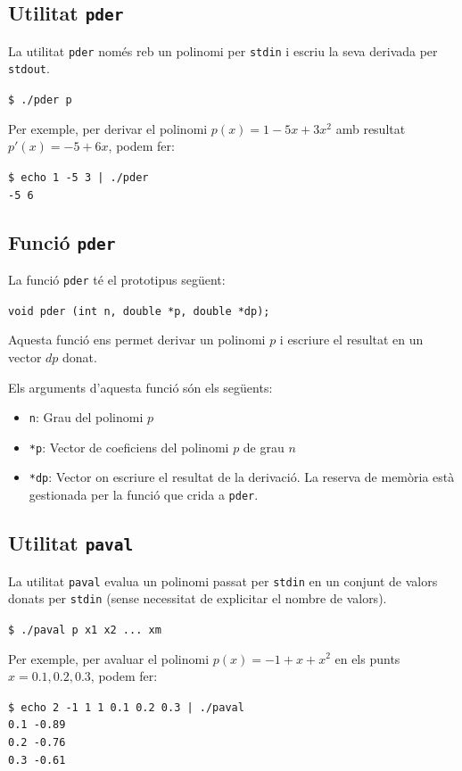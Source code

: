 \documentclass[12pt,twoside,a4paper]{article}
\newcommand{\bash}[1]{\begin{tcolorbox}\texttt{\$ #1}\end{tcolorbox}}
\newcommand{\fn}[2]{\begin{tcolorbox}[enhanced,colback=white,colframe=gray!50!white,attach boxed title to top center={yshift=-3mm,yshifttext=-1mm},title={Funció \texttt{#1}},boxed title style={size=small,colframe=black},colbacktitle=white,coltitle=black]\texttt{#2}\end{tcolorbox}}
\begin{document}
\newpage

\subsection{Utilitat \texttt{pder}}
La utilitat \texttt{pder} només reb un polinomi per \texttt{stdin} i escriu la seva derivada per \texttt{stdout}.
\bash{./pder p}

Per exemple, per derivar el polinomi $p(x) = 1 - 5x + 3x^2$ amb resultat $p'(x) = -5 + 6x$, podem fer:
\bash{echo 1 -5 3 | ./pder\\-5 6}

\subsection{Funció \texttt{pder}}
La funció \texttt{pder} té el prototipus següent:

\fn{pder}{void pder (int n, double *p, double *dp);}

Aquesta funció ens permet derivar un polinomi $p$ i escriure el resultat en un vector $dp$ donat.

Els arguments d'aquesta funció són els següents:
\begin{itemize}
    \item \texttt{n}: Grau del polinomi $p$
    \item \texttt{*p}: Vector de coeficiens del polinomi $p$ de grau $n$
    \item \texttt{*dp}: Vector on escriure el resultat de la derivació. La reserva de memòria està gestionada per la funció que crida a \texttt{pder}.
\end{itemize}

\newpage

\subsection{Utilitat \texttt{paval}}
La utilitat \texttt{paval} evalua un polinomi passat per \texttt{stdin} en un conjunt de valors donats per \texttt{stdin} (sense necessitat de explicitar el nombre de valors).
\bash{./paval p x1 x2 ... xm }

Per exemple, per avaluar el polinomi $p(x) = -1 + x + x^2$ en els punts $x = 0.1, 0.2, 0.3$, podem fer:

\bash{echo 2 -1 1 1 0.1 0.2 0.3 | ./paval\\0.1 -0.89\\0.2 -0.76\\0.3 -0.61}
\end{document}
